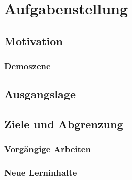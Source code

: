 
\chapter{Aufgabenstellung}
\label{chap:scope}


\section{Motivation}
\label{sec:motivation}


\subsection{Demoszene}
\label{subsec:demoscene}


\section{Ausgangslage}
\label{sec:initial_situation}


\section{Ziele und Abgrenzung}
\label{sec:objectives}


\subsection{Vorgängige Arbeiten}
\label{subsec:preliminaries}


\subsection{Neue Lerninhalte}
\label{subsec:new_learning_contents}

